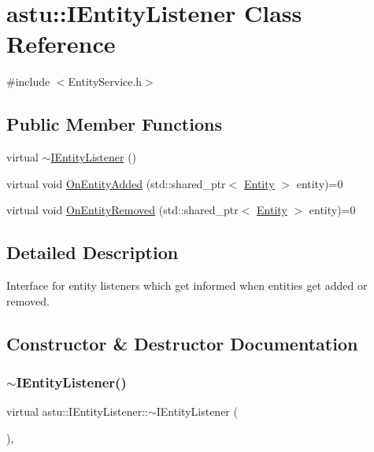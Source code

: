 \hypertarget{classastu_1_1IEntityListener}{}\section{astu\+:\+:I\+Entity\+Listener Class Reference}
\label{classastu_1_1IEntityListener}


{\ttfamily \#include $<$Entity\+Service.\+h$>$}

\subsection*{Public Member Functions}
\begin{DoxyCompactItemize}
\item 
virtual \hyperlink{classastu_1_1IEntityListener_ad3e01cd267ff128c2176d06897c8c7b6}{$\sim$\+I\+Entity\+Listener} ()
\item 
virtual void \hyperlink{classastu_1_1IEntityListener_a97132aa5a0f0e593c487127b32505447}{On\+Entity\+Added} (std\+::shared\+\_\+ptr$<$ \hyperlink{classastu_1_1Entity}{Entity} $>$ entity)=0
\item 
virtual void \hyperlink{classastu_1_1IEntityListener_a4fbd5c1a239a1c57c1567a630016074b}{On\+Entity\+Removed} (std\+::shared\+\_\+ptr$<$ \hyperlink{classastu_1_1Entity}{Entity} $>$ entity)=0
\end{DoxyCompactItemize}


\subsection{Detailed Description}
Interface for entity listeners which get informed when entities get added or removed. 

\subsection{Constructor \& Destructor Documentation}
\mbox{\label{classastu_1_1IEntityListener_ad3e01cd267ff128c2176d06897c8c7b6}} 
\subsubsection{\texorpdfstring{$\sim$\+I\+Entity\+Listener()}{~IEntityListener()}}
{\footnotesize\ttfamily virtual astu\+::\+I\+Entity\+Listener\+::$\sim$\+I\+Entity\+Listener (\begin{DoxyParamCaption}{ }\end{DoxyParamCaption})\hspace{0.3cm}{\ttfamily [inline]}, {\ttfamily [virtual]}}


